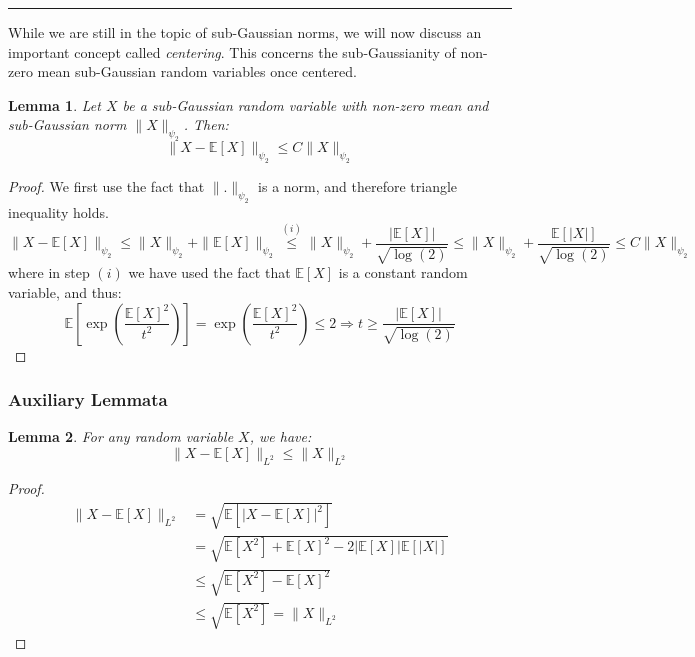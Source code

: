 \documentclass{article}
\newtheorem{lemma}{Lemma}[subsection]
\theoremstyle{remark}
\newcommand{\comprule}{\textcolor[RGB]{220,220,220}{\rule{\linewidth}{0.2pt}}}
\newcommand{\Exp}{\mathbb{E}}
\begin{document}
\comprule

While we are still in the topic of sub-Gaussian norms, we will now discuss an important concept called \emph{centering}. This concerns the sub-Gaussianity of non-zero mean sub-Gaussian random variables once centered.

\begin{lemma}
\label{lem:centering}
Let \(X\) be a sub-Gaussian random variable with non-zero mean and sub-Gaussian norm \(\|X\|_{\psi_{2}}\). Then:
\begin{equation*}
\|X - \Exp[X]\|_{\psi_{2}} \leq C\|X\|_{\psi_{2}}
\end{equation*}
\end{lemma}

\begin{proof}
We first use the fact that \(\|.\|_{\psi_{2}}\) is a norm, and therefore triangle inequality holds.
\begin{equation*}
\|X - \Exp[X]\|_{\psi_{2}} \leq \|X\|_{\psi_{2}} + \|\Exp[X]\|_{\psi_{2}} \overset{(i)}\leq \|X\|_{\psi_{2}} + \frac{|\Exp[X]|}{\sqrt{\log(2)}} \leq \|X\|_{\psi_{2}} + \frac{\Exp[|X|]}{\sqrt{\log(2)}} \leq C\|X\|_{\psi_{2}}
\end{equation*}
where in step \((i)\) we have used the fact that \(\Exp[X]\) is a constant random variable, and thus:
\begin{equation*}
\Exp\left[\exp\left(\frac{\Exp[X]^{2}}{t^{2}}\right)\right] = \exp\left(\frac{\Exp[X]^{2}}{t^{2}}\right) \leq 2 \Rightarrow t \geq \frac{|\Exp[X]|}{\sqrt{\log(2)}}
\end{equation*}
\end{proof}

\subsubsection{Auxiliary Lemmata}
\begin{lemma}
For any random variable \(X\), we have:
\begin{equation*}
\|X - \Exp[X]\|_{L^{2}} \leq \|X\|_{L^{2}}
\end{equation*}
\end{lemma}

\begin{proof}
\begin{align*}
\|X - \Exp[X]\|_{L^{2}} &= \sqrt{\Exp[|X - \Exp[X]|^{2}]} \\
&= \sqrt{\Exp[X^{2}] + \Exp[X]^{2} - 2|\Exp[X]|\Exp[|X|]} \\
&\leq \sqrt{\Exp[X^{2}] - \Exp[X]^{2}} \\
&\leq \sqrt{\Exp[X^{2}]} = \|X\|_{L^{2}}
\end{align*}
\end{proof}
\end{document}
